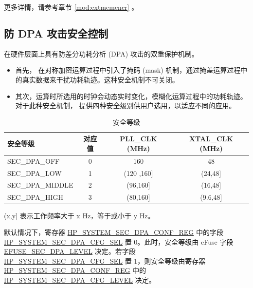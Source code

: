 \documentclass[main\_\_CN.tex]{subfiles}
\begin{document}
更多详情，请参考章节 \ref{mod:extmemencr} \textit{}。


\subsection{防 DPA 攻击安全控制}
\label{sec:sysreg-anti-dpa-attack-security-control}

\chipname{} 在硬件层面上具有防差分功耗分析 (DPA) 攻击的双重保护机制。

\begin{itemize}
    \item 首先，\chipname{} 在对称加密运算过程中引入了掩码 (mask) 机制，通过掩盖运算过程中的真实数据来干扰功耗轨迹。这种安全机制不可关闭。
    \item 其次，运算时所选用的时钟会动态实时变化，模糊化运算过程中的功耗轨迹。对于此种安全机制，\chipname{} 提供四种安全级别供用户选用，以适应不同的应用。
\end{itemize}

\begin{table}[H]
    \centering
    \caption{安全等级}
    \label{tab:sysreg-security-level}
    \begin{threeparttable}
    \begin{tabular}[c]{| l | c | c | c |}
    \hline
    \rowcolor{lightgray}
        \textbf{安全等级} & \textbf{对应值} & \textbf{PLL\_CLK (MHz)} & \textbf{XTAL\_CLK (MHz)} \\ \hline
        SEC\_DPA\_OFF       & 0    & 160           & 48          \\\hline
        SEC\_DPA\_LOW       & 1    & (120 ,160]\tnote{A}   & (24,48]\tnote{A}   \\\hline
        SEC\_DPA\_MIDDLE    & 2    & (96,160]\tnote{A}    & (16,48]\tnote{A} \\\hline
        SEC\_DPA\_HIGH      & 3    & (80,160]\tnote{A}    & (9.6,48]\tnote{A}   \\\hline
    \end{tabular}
    \begin{tablenotes}
        \item[A] (x,y] 表示工作频率大于 x Hz，等于或小于 y Hz。
    \end{tablenotes}
    \end{threeparttable}
\end{table}

默认情况下，寄存器 \hyperref[regdesc:HPSYSTEMSECDPACONFREG]{HP\_SYSTEM\_SEC\_DPA\_CONF\_REG} 中的字段 \hyperref[fielddesc:HPSYSTEMSECDPALEVEL]{HP\_SYSTEM\_SEC\_DPA\_CFG\_SEL} 置 0。此时，安全等级由 eFuse 字段 \hyperref[fielddesc:EFUSESECDPALEVEL]{EFUSE\_SEC\_DPA\_LEVEL} 决定。若字段 \hyperref[fielddesc:HPSYSTEMSECDPALEVEL]{HP\_SYSTEM\_SEC\_DPA\_CFG\_SEL} 置 1，则安全等级由寄存器 \hyperref[regdesc:HPSYSTEMSECDPACONFREG]{HP\_SYSTEM\_SEC\_DPA\_CONF\_REG} 中的 \hyperref[fielddesc:HPSYSTEMSECDPALEVEL]{HP\_SYSTEM\_SEC\_DPA\_CFG\_LEVEL} 决定。
\end{document}

